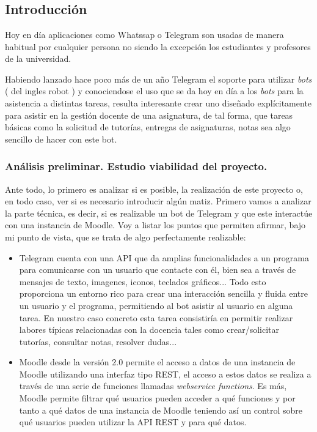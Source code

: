 \chapter{}



\section{Introducción}

Hoy en día aplicaciones como Whatssap o Telegram son usadas de manera habitual por cualquier persona no siendo la excepción los estudiantes y profesores de la universidad.

\par
Habiendo lanzado hace poco más de un año Telegram el soporte para utilizar \textit{bots} ( del ingles robot ) y conociendose el uso que se da hoy en día a los \textit{bots} para la asistencia a distintas tareas,  resulta interesante crear uno diseñado explícitamente para asistir en la gestión docente de una asignatura, de tal forma, que tareas básicas como la solicitud de tutorías, entregas de asignaturas, notas sea algo sencillo de hacer con este bot.

\subsection{Análisis preliminar. Estudio viabilidad del proyecto.}

Ante todo, lo primero es analizar si es posible, la realización de este proyecto o, en todo caso, ver si es necesario introducir algún matiz. Primero vamos a analizar la parte técnica, es decir, si es realizable un bot de Telegram y que este interactúe con una instancia de Moodle. Voy a listar los puntos que permiten afirmar, bajo mi punto de vista, que se trata de algo perfectamente realizable:

\begin{itemize}
\item Telegram cuenta con una API que da amplias funcionalidades a un programa para comunicarse con un usuario que contacte con él, bien sea a través de mensajes de texto, imagenes, iconos, teclados gráficos... Todo esto proporciona un entorno rico para crear una interacción  sencilla y fluida entre un usuario y el programa, permitiendo al bot asistir al usuario en alguna tarea. En nuestro caso concreto esta tarea consistiría en permitir  realizar labores típicas relacionadas con la docencia tales como crear/solicitar tutorías, consultar notas, resolver dudas... 
\item Moodle desde la versión 2.0 permite el acceso a datos de una instancia de Moodle utilizando una interfaz tipo REST, el acceso a estos datos se realiza a través de una serie de funciones llamadas \textit{webservice functions}.  Es más, Moodle permite filtrar qué usuarios pueden acceder a qué funciones y por tanto a qué datos de una instancia de Moodle  teniendo así un control sobre qué usuarios pueden utilizar la API REST y para qué datos.
\end{itemize}


